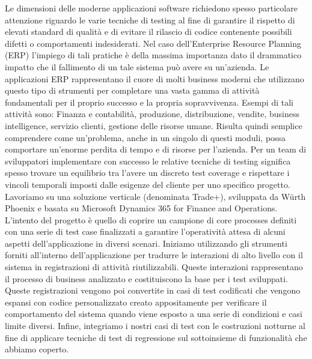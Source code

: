 Le dimensioni delle moderne applicazioni software richiedono spesso particolare attenzione riguardo le varie tecniche di testing al fine di garantire il rispetto di elevati standard di qualità e di evitare il rilascio di codice contenente possibili difetti o comportamenti indesiderati. 
Nel caso dell'Enterprise Resource Planning (ERP) l'impiego di tali pratiche è della massima importanza dato il drammatico impatto che il fallimento di un tale sistema può avere su un'azienda. 
Le applicazioni ERP rappresentano il cuore di molti business moderni che utilizzano questo tipo di strumenti per completare una vasta gamma di attività fondamentali per il proprio successo e la propria sopravvivenza. Esempi di tali attività sono: 
Finanza e contabilità, produzione, distribuzione, vendite, business intelligence, servizio clienti, gestione delle risorse umane. 
Risulta quindi semplice comprendere come un'problema, anche in un singolo di questi moduli, possa comportare un'enorme perdita di tempo e di risorse  per l'azienda. 
Per un team di sviluppatori implementare con successo le relative tecniche di testing significa spesso trovare un equilibrio tra l'avere un discreto test coverage e rispettare i vincoli temporali imposti dalle esigenze del cliente per uno specifico progetto. 
Lavoriamo su una soluzione verticale (denominata Trade+), sviluppata da Würth Phoenix e basata su Microsoft Dynamics 365 for Finance and Operations. L'intento del progetto è quello di coprire un campione di core processes definiti con una serie di test case finalizzati a garantire l'operatività attesa di alcuni aspetti dell'applicazione in diversi scenari. Iniziamo utilizzando gli strumenti forniti all'interno dell'applicazione per tradurre le interazioni di alto livello con il sistema in registrazioni di attività riutilizzabili. Queste interazioni rappresentano il processo di business analizzato e costituiscono la base per i test sviluppati. Queste registrazioni vengono poi convertite in casi di test codificati che vengono espansi con codice personalizzato creato appositamente per verificare il comportamento del sistema quando viene esposto a una serie di condizioni e casi limite diversi. Infine, integriamo i nostri casi di test con le costruzioni notturne al fine di applicare tecniche di test di regressione sul sottoinsieme di funzionalità che abbiamo coperto. 

